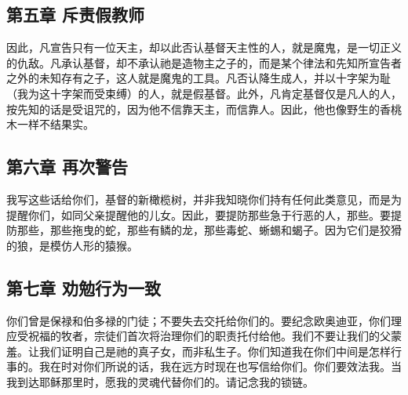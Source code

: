
\subsection{第五章  斥责假教师}

因此，凡宣告只有一位天主，却以此否认基督天主性的人，就是魔鬼，是一切正义的仇敌。凡承认基督，却不承认祂是造物主之子的，而是某个律法和先知所宣告者之外的未知存有之子，这人就是魔鬼的工具。凡否认降生成人，并以十字架为耻（我为这十字架而受束缚）的人，就是假基督。此外，凡肯定基督仅是凡人的人，按先知的话是受诅咒的，因为他不信靠天主，而信靠人。因此，他也像野生的香桃木一样不结果实。\par


\subsection{第六章  再次警告}

我写这些话给你们，基督的新橄榄树，并非我知晓你们持有任何此类意见，而是为提醒你们，如同父亲提醒他的儿女。因此，要提防那些急于行恶的人，那些。要提防那些，那些拖曳的蛇，那些有鳞的龙，那些毒蛇、蜥蜴和蝎子。因为它们是狡猾的狼，是模仿人形的猿猴。\par


\subsection{第七章  劝勉行为一致}

你们曾是保禄和伯多禄的门徒；不要失去交托给你们的。要纪念欧奥迪亚，你们理应受祝福的牧者，宗徒们首次将治理你们的职责托付给他。我们不要让我们的父蒙羞。让我们证明自己是祂的真子女，而非私生子。你们知道我在你们中间是怎样行事的。我在时对你们所说的话，我在远方时现在也写信给你们。你们要效法我。当我到达耶稣那里时，愿我的灵魂代替你们的。请记念我的锁链。\par


